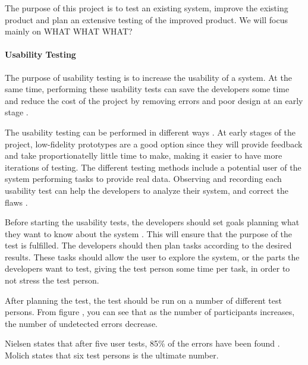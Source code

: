 The purpose of this project is to test an existing system, improve the existing product and plan an extensive testing of the improved product. We will focus mainly on WHAT WHAT WHAT?

\paragraph{Usability Testing}
The purpose of usability testing is to increase the usability of a system. At the same time, performing these usability tests can save the developers some time and reduce the cost of the project by removing errors and poor design at an early stage \cite{dumas1995practical}.

The usability testing can be performed in different ways \cite{schneidermanusercentered}. At early stages of the project, low-fidelity prototypes are a good option since they will provide feedback and take proportionatelly little time to make, making it easier to have more iterations of testing. The different testing methods include a potential user of the system performing tasks to provide real data. Observing and recording each usability test can help the developers to analyze their system, and correct the flaws \cite{dumas1995practical}. 

Before starting the usability tests, the developers should set goals planning what they want to know about the system \cite{isosoftwareengineering}. This will ensure that the purpose of the test is fulfilled. The developers should then plan tasks according to the desired results. These tasks should allow the user to explore the system, or the parts the developers want to test, giving the test person some time per task, in order to not stress the test person. 

After planning the test, the test should be run on a number of different test persons. From figure %
, you can see that as the number of participants increases, the number of undetected errors decrease. 


Nielsen states that after five user tests, 85\% of the errors have been found \cite{nielsennumberoftests}. Molich\cite{molich2008usable} states that six test persons is the ultimate number. 

